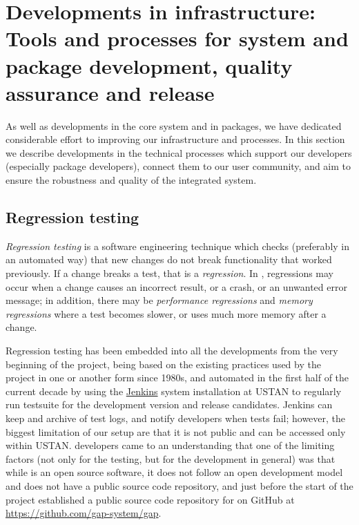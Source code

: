 \section{Developments in \GAP infrastructure: Tools and processes for
  system and package development, quality assurance and release }\label{sec:gap-infra}

As well as developments in the core system and in packages, we have
dedicated considerable effort to improving our infrastructure and processes. 
In this section we describe developments in the technical processes
which support our developers (especially package developers),
connect them to our user community, and aim to 
ensure the robustness and quality of the integrated system.


\subsection{Regression testing}\label{testing}

\emph{Regression testing} is a software engineering technique which
checks (preferably in an automated way)
that new changes do not break functionality that 
worked previously. If a change breaks a test, that is 
a \emph{regression}. In \GAP, regressions may occur
when a change causes an incorrect result, or a crash, or an unwanted error
message; in addition, there may be \emph{performance regressions}
and \emph{memory regressions} where a test becomes slower, or uses
much more memory after a change.

Regression testing has been embedded into all the \GAP developments
from the very beginning of the project, being based on the existing
practices used by the \GAP project in one or another form since 1980s,
and automated in the first half of the current decade by 
using the \href{https://jenkins.io/}{\sf Jenkins} system installation
at USTAN to regularly run \GAP testsuite for the \GAP development 
version and release candidates.
{\sf Jenkins} can keep and archive of test logs, and notify
developers when tests fail; however, the biggest limitation of our setup are that
it is not public and can be accessed only within USTAN. 
\GAP developers came to an understanding 
that one of the limiting factors (not only for the testing, but for
the \GAP development in general) was that while \GAP is an open source 
software, it does not follow an open development model and does not
have a public source code repository, and just before the start of
the project established a public source code repository for \GAP
on GitHub at \url{https://github.com/gap-system/gap}. 


